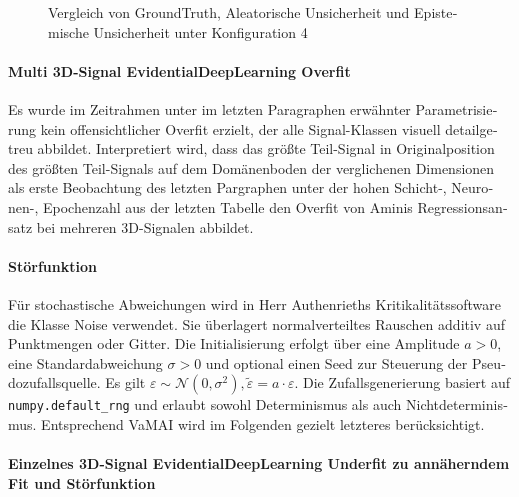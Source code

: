 \begin{otherlanguage}{ngerman}
\begin{figure}[!ht]
  \caption{Vergleich von \gls{GroundTruth}, \gls{Aleatorische Unsicherheit} und \gls{Epistemische Unsicherheit} unter Konfiguration 4}
  \label{fig:three_subfigures3}
\end{figure}



\paragraph{Multi 3D-Signal \gls{EvidentialDeepLearning} Overfit} Es wurde im Zeitrahmen unter im letzten Paragraphen erwähnter Parametrisierung kein offensichtlicher Overfit erzielt, der alle Signal-Klassen visuell detailgetreu abbildet. Interpretiert wird, dass das größte Teil-Signal in Originalposition des größten Teil-Signals auf dem Domänenboden der verglichenen Dimensionen als erste Beobachtung des letzten Pargraphen unter der hohen Schicht-, Neuronen-, Epochenzahl aus der letzten Tabelle den Overfit von Aminis Regressionsansatz bei mehreren 3D-Signalen abbildet.  



\paragraph{Störfunktion} Für stochastische Abweichungen wird in Herr Authenrieths Kritikalitätssoftware die Klasse Noise verwendet. Sie überlagert normalverteiltes Rauschen additiv auf Punktmengen oder Gitter. Die Initialisierung erfolgt über eine Amplitude \( a > 0 \), eine Standardabweichung \( \sigma > 0 \) und optional einen Seed zur Steuerung der Pseudozufallsquelle. Es gilt $\varepsilon \sim \mathcal{N}(0, \sigma^2), \tilde{\varepsilon} = a \cdot \varepsilon$. Die Zufallsgenerierung basiert auf \texttt{numpy.default\_rng} und erlaubt sowohl Determinismus als auch Nichtdeterminismus. Entsprechend VaMAI wird im Folgenden gezielt letzteres berücksichtigt.



\paragraph{Einzelnes 3D-Signal \gls{EvidentialDeepLearning} Underfit zu annäherndem Fit und Störfunktion} 


\end{otherlanguage}
